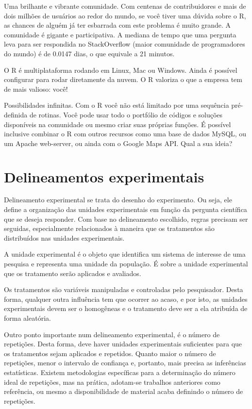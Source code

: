 \documentclass[
]{article}
\begin{document}
Uma brilhante e vibrante comunidade. Com centenas de contribuidores e mais de dois milhões de usuários ao redor do mundo, se você tiver uma dúvida sobre o R, as chances de alguém já ter esbarrada com este problema é muito grande. A comunidade é gigante e participativa. A mediana de tempo que uma pergunta leva para ser respondida no StackOverflow (maior comunidade de programadores do mundo) é de 0.0147 dias, o que equivale a 21 minutos.

O R é multiplataforma rodando em Linux, Mac ou Windows. Ainda é possível configurar para rodar diretamente da nuvem. O R valoriza o que a empresa tem de mais valioso: você!

Possibilidades infinitas. Com o R você não está limitado por uma sequência pré-definida de rotinas. Você pode usar todo o portfólio de códigos e soluções disponíveis na comunidade ou mesmo criar suas próprias funções. É possível inclusive combinar o R com outros recursos como uma base de dados MySQL, ou um Apache web-server, ou ainda com o Google Maps API. Qual a sua ideia?

\hypertarget{delineamentos-experimentais}{%
\section{Delineamentos experimentais}\label{delineamentos-experimentais}}

Delineamento experimental se trata do desenho do experimento. Ou seja, ele define a organização das unidades experimentais em função da pergunta científica que se deseja responder. Com base no delineamento escolhido, regras precisam ser seguidas, especialmente relacionados à maneira que os tratamentos são distribuídos nas unidades experimentais.

A unidade experimental é o objeto que identifica um sistema de interesse de uma pesquisa e representa uma unidade da população. É sobre a unidade experimental que os tratamento serão aplicados e avaliados.

Os tratamentos são variáveis manipuladas e controladas pelo pesquisador. Desta forma, qualquer outra influência tem que ocorrer ao acaso, e por isto, as unidades experimentais devem ser o homogêneas e o tratamento deve ser a ela atribuída de forma aleatória.

Outro ponto importante num delineamento experimental, é o número de repetições. Desta forma, deve haver unidades experimentais suficientes para que os tratamentos sejam aplicados e repetidos. Quanto maior o número de repetições, menor o intervalo de confiança e, portanto, mais precisa as inferências estatísticas. Existem metodologias específicas para a determinação do número ideal de repetições, mas na prática, adotam-se trabalhos anteriores como referência, ou mesmo a disponibilidade de material acaba definindo o número de repetições.
\end{document}
